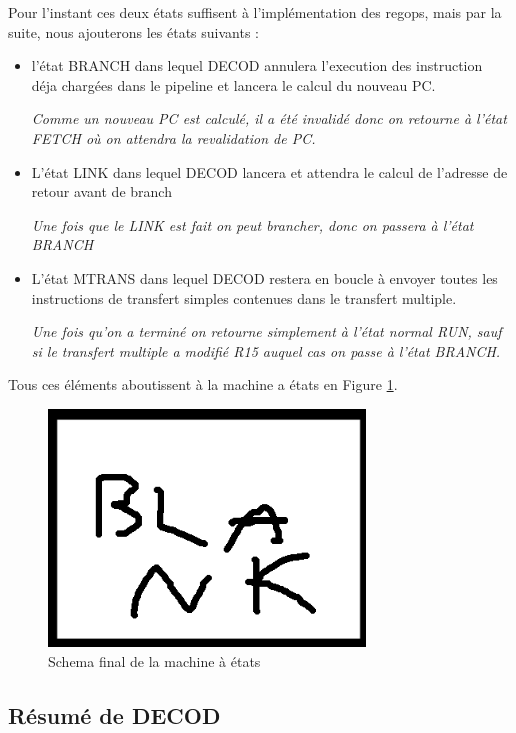 \documentclass{article}
\begin{document}
Pour l'instant ces deux états suffisent à l'implémentation des regops, mais par la suite,
nous ajouterons les états suivants :
\begin{itemize}
 \item l'état BRANCH dans lequel DECOD annulera l'execution des instruction déja chargées dans le pipeline
       et lancera le calcul du nouveau PC.

       \textit{Comme un nouveau PC est calculé, il a été invalidé donc on retourne à l'état FETCH où on attendra
       la revalidation de PC.}
 \item L'état LINK dans lequel DECOD lancera et attendra le calcul de l'adresse de retour avant de branch

       \textit{Une fois que le LINK est fait on peut brancher, donc on passera à l'état BRANCH}
 \item L'état MTRANS dans lequel DECOD restera en boucle à envoyer toutes les instructions de transfert simples
       contenues dans le transfert multiple.

       \textit{Une fois qu'on a terminé on retourne simplement à l'état normal RUN, sauf si le transfert multiple a
       modifié R15 auquel cas on passe à l'état BRANCH.}
\end{itemize}

Tous ces éléments aboutissent à la machine a états en Figure \ref{mae}.

\begin{figure}[H]
\includegraphics[width=0.75\textwidth]{pics/blank.png}
\centering
\caption{Schema final de la machine à états}
\label{mae}
\end{figure}

\subsection{Résumé de DECOD}
\end{document}
